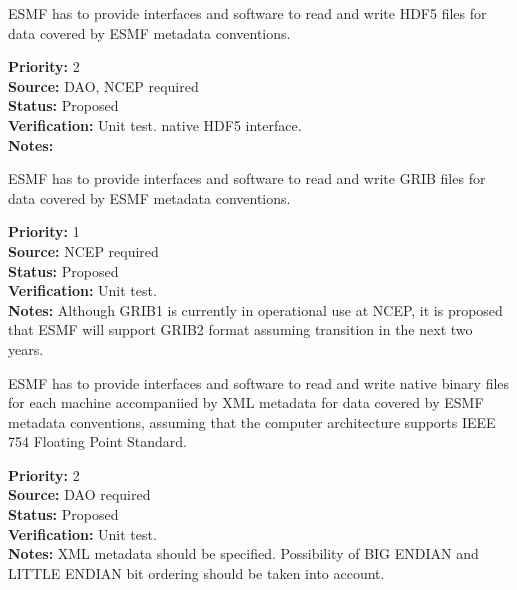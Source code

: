 
ESMF has to provide interfaces and software to read and write HDF5
files for data covered by ESMF metadata conventions. 

\begin{reqlist}
{\bf Priority:} 2 \\
{\bf Source:} DAO, NCEP required \\
{\bf Status:} Proposed \\
{\bf Verification:} Unit test. 
native HDF5 interface. \\
{\bf Notes:}
\end{reqlist}


ESMF has to provide interfaces and software to read and write GRIB
files for data covered by ESMF metadata conventions. 

\begin{reqlist}
{\bf Priority:} 1 \\
{\bf Source:} NCEP required \\
{\bf Status:} Proposed \\
{\bf Verification:} Unit test. \\
{\bf Notes:} Although GRIB1 is currently in operational use at NCEP,
it is proposed that ESMF will support GRIB2 format assuming transition
in the next two years.
\end{reqlist}


ESMF has to provide interfaces and software to read and write native
binary files for each machine accompaniied by XML metadata for data
covered by ESMF metadata conventions, assuming that the computer architecture
supports IEEE 754 Floating Point Standard. 

\begin{reqlist}
{\bf Priority:} 2 \\
{\bf Source:} DAO required \\
{\bf Status:} Proposed \\
{\bf Verification:} Unit test. \\
{\bf Notes:} XML metadata should be specified. Possibility of BIG
ENDIAN and LITTLE ENDIAN bit ordering should be taken into account.
\end{reqlist}




